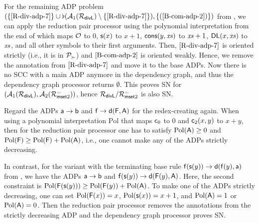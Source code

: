 \begin{example}\label{example:rel-RPP}
    For the remaining ADP problem
    $(\{\eqref{R-div-adp-7}\} \cup \flat(\mathcal{A}_{1}(\mathcal{R}_{\mathsf{divL}}) \setminus \{\eqref{R-div-adp-7}\}),\{(\ref{B-com-adp-2})\})$ 
    from , we can apply the reduction pair processor
    using the polynomial interpretation from the end of  which maps 
    $\mathcal{O}$ to $0$, $\mathsf{s}(x)$ to $x + 1$,
    $\mathsf{cons}(y,\mathit{xs})$ to $\mathit{xs} + 1$, $\mathsf{DL}(x,\mathit{xs})$ to $\mathit{xs}$,
    and all other symbols to their first arguments. 
    Then, $\eqref{R-div-adp-7}$ is oriented strictly (i.e., it is in
    $\mathcal{P}_{\succ}$) and $\eqref{B-com-adp-2}$ is oriented weakly.
    Hence, we remove the annotation from $\eqref{R-div-adp-7}$ and move it to the base
    ADPs.
    Now there is no SCC with a main ADP anymore in the
    dependency graph, and thus the dependency graph processor 
    returns $\emptyset$.
    This proves SN for $(\mathcal{A}_{1}(\mathcal{R}_{\mathsf{divL}}), \mathcal{A}_{2}(\mathcal{R}^{=}_{\mathsf{mset} 2}))$, hence
    $\mathcal{R}_{\mathsf{divL}} / \mathcal{R}^{=}_{\mathsf{mset} 2}$ is also SN.
\end{example}

\begin{example}\label{ex:RPPCreating}
    Regard the ADPs
    $\mathsf{a} \to \mathsf{b}$  and $\mathsf{f} \to \mathsf{d}(\mathsf{F},\mathsf{A})$ for
    the redex-creating   again.
    When using  a polynomial interpretation  $\mathrm{Pol}$ that maps $\mathsf{c}_{0}$ to $0$ and
    $\mathsf{c}_{2}(x,y)$ to $x + y$, then for the reduction pair processor 
    one has to satisfy $\mathrm{Pol}(\mathsf{A}) \geq 0$ and
    $\mathrm{Pol}(\mathsf{F}) \geq \mathrm{Pol}(\mathsf{F}) + \mathrm{Pol}(\mathsf{A})$, i.e.,
    one cannot
    make any of the ADPs strictly decreasing.

    In contrast, for the variant
    with the terminating base rule  $\mathsf{f}(\mathsf{s}(y)) \to \mathsf{d}(\mathsf{f}(y),\mathsf{a})$ from ,
    we have the ADPs $\mathsf{a} \to \mathsf{b}$  and $\mathsf{f}(\mathsf{s}(y)) \to \mathsf{d}(\mathsf{F}(y),\mathsf{A})$. 
    Here, the second constraint is  $\mathrm{Pol}(\mathsf{F}(\mathsf{s}(y))) \geq
    \mathrm{Pol}(\mathsf{F}(y)) + \mathrm{Pol}(\mathsf{A})$. To make 
    one of the ADPs strictly decreasing,
    one can set
    $\mathrm{Pol}(\mathsf{F}(x)) = x$, $\mathrm{Pol}(\mathsf{s}(x)) = x+1$, and
    $\mathrm{Pol}(\mathsf{A}) = 1$ or $\mathrm{Pol}(\mathsf{A}) = 0$.
    Then the reduction pair processor
    removes the annotations from the strictly decreasing ADP and 
     the dependency graph processor  proves SN.
\end{example}
